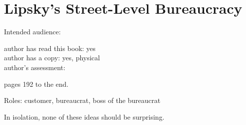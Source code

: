 \section{Lipsky's Street-Level Bureaucracy\label{review:lipsky_street}}

\cite{1983_Lipsky}

Intended audience:

author has read this book: yes\\
author has a copy: yes, physical\\
author's assessment:


pages 192 to the end.

Roles: customer, bureaucrat, boss of the bureaucrat

In isolation, none of these ideas should be surprising.
